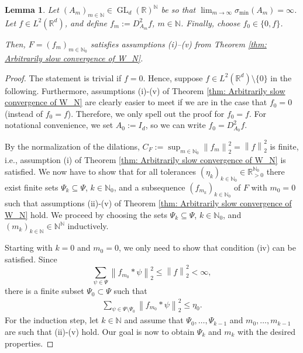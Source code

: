 \documentclass[10pt,a4paper]{amsart}
\newtheorem{lemma}{Lemma}
\DeclareMathOperator{\GL}{GL}
\newcommand{\N}{\mathbb{N}}
\newcommand{\R}{{\mathbb{R}}}
\newcommand{\norm}[1]{\ensuremath{\left\lVert\text{}#1\text{}\right\rVert}}
\begin{document}
  \begin{lemma}\label{lem: Matrix dilations satisfy assumptions for approx add}
    Let $(A_m)_{m \in \N} \in \GL_d(\R)^\N$ be so that $\lim_{m \to \infty}\sigma_{\text{min}}(A_m)=\infty$. Let $f \in L^2(\R^d)$, and define $f_m:=D_{A_m}^2f$, $m \in \N$. Finally, choose $f_0 \in \{0,f\}$.
    
    Then, $F=(f_m)_{m \in \N_0}$ satisfies assumptions (i)--(v) from Theorem \ref{thm: Arbitrarily slow convergence of W_N}.
  \end{lemma}

  \begin{proof}
    The statement is trivial if $f=0$. Hence, suppose $f \in L^2(\R^d)\setminus\{0\}$ in the following. Furthermore, assumptions (i)-(v) of Theorem \ref{thm: Arbitrarily slow convergence of W_N} are clearly easier to meet if we are in the case that $f_0=0$ (instead of $f_0=f$). Therefore, we only spell out the proof for $f_0=f$. For notational convenience, we set $A_0:=I_d$, so we can write $f_0=D_{A_0}^2f$.
  
    By the normalization of the dilations, $C_F:=\sup_{m\in \N_0}\norm{f_m}_2^2=\norm{f}_2^2$ is finite, i.e., assumption (i) of Theorem \ref{thm: Arbitrarily slow convergence of W_N} is satisfied. We now have to show that for all tolerances $(\eta_k)_{k \in \N_0} \in \R_{>0}^{\N_0}$ there exist finite sets $\Psi_k\subseteq \Psi$, $k \in \N_0$, and a subsequence $(f_{m_k})_{k \in \N_0}$ of $F$ with $m_0=0$ such that assumptions (ii)-(v) of Theorem \ref{thm: Arbitrarily slow convergence of W_N} hold.
    We proceed by choosing the sets $\Psi_k\subseteq \Psi$, $k \in \N_0$, and $({m_k})_{k \in \N}\in \N^\N$ inductively.
    
    Starting with $k=0$ and $m_0=0$, we only need to show that condition (iv) can be satisfied. Since 
    \[\sum_{\psi \in \Psi} \norm{f_{m_0}*\psi}_2^2\leq \norm{f}_2^2<\infty,\] there is a finite subset $\Psi_0\subset \Psi$ such that 
    \begin{align*}
      \sum_{\psi \in \Psi\setminus\Psi_0} \norm{f_{m_0}*\psi}_2^2 \leq \eta_0.
    \end{align*} 
    For the induction step, let $k \in \N$ and assume that $\Psi_0,\ldots,\Psi_{k-1}$ and $m_0,\ldots,m_{k-1}$ are such that (ii)-(v) hold. Our goal is now to obtain $\Psi_k$ and $m_k$ with the desired properties. 
    

\end{proof}
\end{document}
